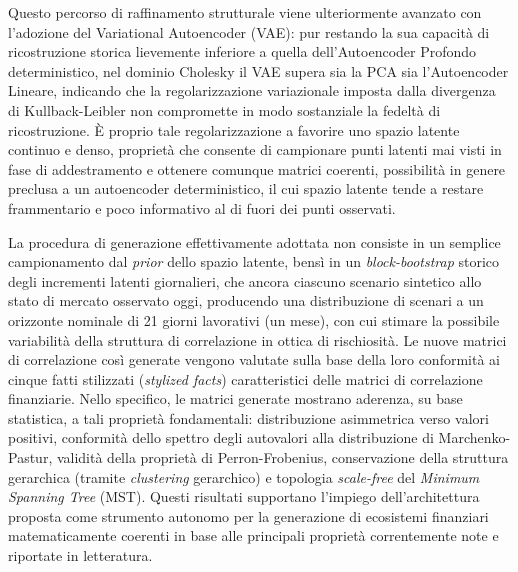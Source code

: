 \documentclass[twoside,greek]{toptesi}
\begin{document}
Questo percorso di raffinamento strutturale viene ulteriormente avanzato con l'adozione del Variational Autoencoder (VAE): pur restando la sua capacità di ricostruzione storica lievemente inferiore a quella dell'Autoencoder Profondo deterministico, nel dominio Cholesky il VAE supera sia la PCA sia l'Autoencoder Lineare, indicando che la regolarizzazione variazionale imposta dalla divergenza di Kullback-Leibler non compromette in modo sostanziale la fedeltà di ricostruzione. È proprio tale regolarizzazione a favorire uno spazio latente continuo e denso, proprietà che consente di campionare punti latenti mai visti in fase di addestramento e ottenere comunque matrici coerenti, possibilità in genere preclusa a un autoencoder deterministico, il cui spazio latente tende a restare frammentario e poco informativo al di fuori dei punti osservati.

La procedura di generazione effettivamente adottata non consiste in un semplice campionamento dal \emph{prior} dello spazio latente, bensì in un \emph{block-bootstrap} storico degli incrementi latenti giornalieri, che ancora ciascuno scenario sintetico allo stato di mercato osservato oggi, producendo una distribuzione di scenari a un orizzonte nominale di 21 giorni lavorativi (un mese), con cui stimare la possibile variabilità della struttura di correlazione in ottica di rischiosità. Le nuove matrici di correlazione così generate vengono valutate sulla base della loro conformità ai cinque fatti stilizzati (\emph{stylized facts}) caratteristici delle matrici di correlazione finanziarie. Nello specifico, le matrici generate mostrano aderenza, su base statistica, a tali proprietà fondamentali: distribuzione asimmetrica verso valori positivi, conformità dello spettro degli autovalori alla distribuzione di Marchenko-Pastur, validità della proprietà di Perron-Frobenius, conservazione della struttura gerarchica (tramite \emph{clustering} gerarchico) e topologia \emph{scale-free} del \emph{Minimum Spanning Tree} (MST). Questi risultati supportano l'impiego dell'architettura proposta come strumento autonomo per la generazione di ecosistemi finanziari matematicamente coerenti in base alle principali proprietà correntemente note e riportate in letteratura.


\clearpage\thispagestyle{empty}\null\clearpage
\end{document}
